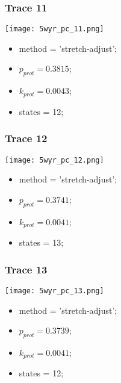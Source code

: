 \subsubsection{Trace 11}
\begin{minipage}[c]{0.7\textwidth}
    \texttt{[image: 5wyr\_pc\_11.png]}
\end{minipage}
\hfill
\begin{minipage}[c]{0.45\textwidth}
    \begin{itemize}
        \item method = 'stretch-adjust';
        \item $p_{prot}=0.3815$;
        \item $k_{prot}=0.0043$;
        \item states = 12;
    \end{itemize}
\end{minipage}

\subsubsection{Trace 12}
\begin{minipage}[c]{0.7\textwidth}
    \texttt{[image: 5wyr\_pc\_12.png]}
\end{minipage}
\hfill
\begin{minipage}[c]{0.45\textwidth}
    \begin{itemize}
        \item method = 'stretch-adjust';
        \item $p_{prot}=0.3741$;
        \item $k_{prot}=0.0041$;
        \item states = 13;
    \end{itemize}
\end{minipage}

\subsubsection{Trace 13}
\begin{minipage}[c]{0.7\textwidth}
    \texttt{[image: 5wyr\_pc\_13.png]}
\end{minipage}
\hfill
\begin{minipage}[c]{0.45\textwidth}
    \begin{itemize}
        \item method = 'stretch-adjust';
        \item $p_{prot}=0.3739$;
        \item $k_{prot}=0.0041$;
        \item states = 12;
    \end{itemize}
\end{minipage}

